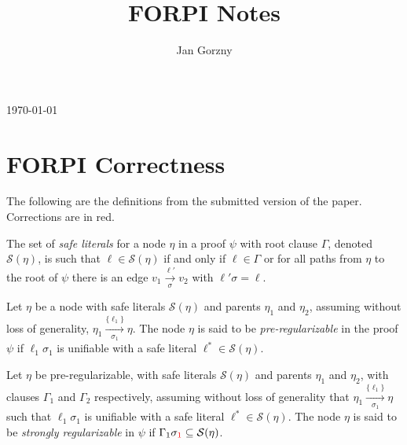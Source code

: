 \documentclass{llncs}
\title{FORPI Notes}
\author{
  Jan Gorzny}
\newcommand{\n}{v}
\begin{document}
\noindent
\hfill\today

\section{FORPI Correctness}

The following are the definitions from the submitted version of the paper. Corrections are in {\color{red}red}.

\begin{definition}
The set of \emph{safe literals} for a node $\eta$ in a proof $\psi$ with root clause $\Gamma$, denoted $\mathcal{S}(\eta)$, is such that $\ell \in \mathcal{S}(\eta)$ if and only if $\ell \in \Gamma$ or for all paths from $\eta$ to the root of $\psi$ there is an edge $\n_1
\xrightarrow[\sigma]{\ell'} \n_2$ with $\ell' \sigma = \ell$.
\end{definition}

\begin{definition}
\label{prop:pair}
Let $\eta$ be a node with safe literals $\mathcal{S}(\eta)$ and parents $\eta_1$ and $\eta_2$, assuming without loss of generality, $\eta_1 \xrightarrow[\sigma_1]{\{\ell_1\} } \eta$.
{\color{red} The node $\eta$ is said to be \emph{pre-regularizable} in the proof $\psi$ if} $\ell_1${\color{red}$\sigma_1$} is unifiable with a safe literal $\ell^* \in \mathcal{S}(\eta)$.
\end{definition}

\begin{definition}
\label{prop:extracheck}
Let $\eta$ be pre-regularizable, with safe literals $\mathcal{S}(\eta)$ and parents $\eta_1$ and $\eta_2$, with clauses $\Gamma_1$ and $\Gamma_2$ respectively, assuming without loss of generality that {\color{red} $\eta_1 \xrightarrow[\sigma_1]{\{\ell_1\} } \eta$}
{\color{red} such that $\ell_1\sigma_1$ is unifiable with a safe literal $\ell^*\in \mathcal{S}(\eta)$}. 
The node $\eta$ is said to be \emph{strongly regularizable} in $\psi$ if $\Gamma_1 \sigma_{\color{red}1} \subseteq \mathcal{S}(\eta)$.
\end{definition}
\end{document}
